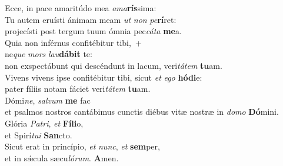 \oddverse Ecce, in pace amaritúdo mea \textit{a}\textit{ma}\textbf{rís}sima:\\
\evenverse Tu autem eruísti ánimam meam \textit{ut} \textit{non} \textit{pe}\textbf{rí}ret:~\*\\
\evenverse projecísti post tergum tuum ómnia pec\textit{cá}\textit{ta} \textbf{me}a.\\
\oddverse Quia non inférnus confitébitur tibi,~+\\
\oddverse  ne\textit{que} \textit{mors} \textit{lau}\textbf{dá}\textbf{bit} te:~\*\\
\oddverse non exspectábunt qui descéndunt in lacum, veri\textit{tá}\textit{tem} \textbf{tu}am.\\
\evenverse Vivens vivens ipse confitébitur tibi, sicut \textit{et} \textit{e}\textit{go} \textbf{hó}\textbf{di}e:~\*\\
\evenverse pater fíliis notam fáciet veri\textit{tá}\textit{tem} \textbf{tu}am.\\
\oddverse Dómi\textit{ne}, \textit{sal}\textit{vum} \textbf{me} fac~\*\\
\oddverse et psalmos nostros cantábimus cunctis diébus vitæ nostræ in \textit{do}\textit{mo} \textbf{Dó}mini.\\
\evenverse Glória \textit{Pa}\textit{tri}, \textit{et} \textbf{Fí}\textbf{li}o,~\*\\
\evenverse et Spirí\textit{tu}\textit{i} \textbf{San}cto.\\
\oddverse Sicut erat in princípio, \textit{et} \textit{nunc}, \textit{et} \textbf{sem}per,~\*\\
\oddverse et in sǽcula sæcu\textit{ló}\textit{rum}. \textbf{A}men.\\
